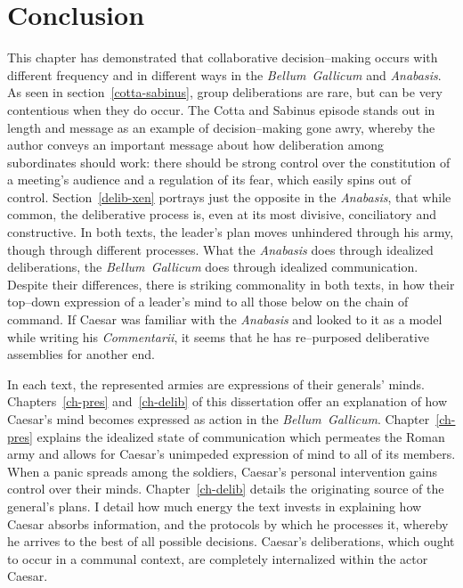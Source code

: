 \documentclass[12pt,letterpaper,oneside,final]{memoir}
\begin{document}
\section{Conclusion}
\label{ind-conc}

This chapter has demonstrated that collaborative decision--making occurs with different frequency and in different ways in the \emph{Bellum~Gallicum} and \emph{Anabasis}. As seen in section~\ref{cotta-sabinus}, group deliberations are rare, but can be very contentious when they do occur. The Cotta and Sabinus episode stands out in length and message as an example of decision--making gone awry, whereby the author conveys an important message about how deliberation among subordinates should work: there should be strong control over the constitution of a meeting's audience and a regulation of its fear, which easily spins out of control. Section~\ref{delib-xen} portrays just the opposite in the \emph{Anabasis}, that while common, the deliberative process is, even at its most divisive, conciliatory and constructive. In both texts, the leader's plan moves unhindered through his army, though through different processes. What the \emph{Anabasis} does through idealized deliberations, the \emph{Bellum~Gallicum} does through idealized communication. Despite their differences, there is striking commonality in both texts, in how their top--down expression of a leader's mind to all those below on the chain of command. If Caesar was familiar with the \emph{Anabasis} and looked to it as a model while writing his \emph{Commentarii}, it seems that he has re--purposed deliberative assemblies for another end.

In each text, the represented armies are expressions of their generals' minds. Chapters~\ref{ch-pres} and~\ref{ch-delib} of this dissertation offer an explanation of how Caesar's mind becomes expressed as action in the \emph{Bellum~Gallicum}. Chapter~\ref{ch-pres} explains the idealized state of communication which permeates the Roman army and allows for Caesar's unimpeded expression of mind to all of its members. When a panic spreads among the soldiers, Caesar's personal intervention gains control over their minds. Chapter~\ref{ch-delib} details the originating source of the general's plans. I detail how much energy the text invests in explaining how Caesar absorbs information, and the protocols by which he processes it, whereby he arrives to the best of all possible decisions. Caesar's deliberations, which ought to occur in a communal context, are completely internalized within the actor Caesar.
\end{document}
